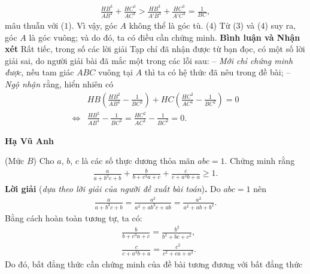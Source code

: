 \begin{multicols}{2}
	\begin{align*}
		\frac{{H{B^3}}}{{A{B^4}}} + \frac{{H{C^3}}}{{A{C^4}}} > \frac{{H{B^3}}}{{A'{B^4}}} + \frac{{H{C^3}}}{{A'{C^4}}} = \frac{1}{{BC}},
	\end{align*}
	mâu thuẫn với ($1$). Vì vậy, góc $A$ không thể là góc tù.  \hfill ($4$)
	\vskip 0.05cm
	Từ ($3$) và ($4$) suy ra, góc $A$ là góc vuông; và do đó, ta có điều cần chứng minh.
	\vskip 0.05cm
	\textbf{\color{thachthuctoanhoc}Bình luận và Nhận xét}
	\vskip 0.05cm
	Rất tiếc, trong số các lời giải Tạp chí đã nhận được từ bạn đọc, có một số lời giải sai, do người giải bài đã mắc một trong các lỗi sau:
	\vskip 0.05cm
	-- \textit{Mới chỉ chứng minh được}, nếu tam giác $ABC$ vuông tại $A$ thì ta có hệ thức đã nêu trong đề bài;
	\vskip 0.05cm
	-- \textit{Ngộ nhận} rằng, hiển nhiên có
	\begin{align*}
		&HB\!\left(\!\!\!\frac{{H{B^2}}}{{A{B^4}}} \!-\! \frac{1}{{B{C^2}}}\!\!\! \right)\!\!+\! HC \! \left(\!\!\!\frac{{H{C^2}}}{{A{C^4}}} \!-\! \frac{1}{{B{C^2}}} \!\!\!\right) \!\!=\! 0\\
		\Leftrightarrow &\frac{{H{B^2}}}{{A{B^4}}} - \frac{1}{{B{C^2}}} = \frac{{H{C^2}}}{{A{C^4}}} - \frac{1}{{B{C^2}}} = 0.
	\end{align*}
	\begin{flushright}
		\textbf{\color{thachthuctoanhoc}Hạ Vũ Anh}
	\end{flushright}
	{}
	(Mức $B$)
	Cho $a$, $b$, $c$ là các số thực dương thỏa mãn $abc = 1$. Chứng minh rằng
	\begin{align*}
		\frac{a}{{a \!+ \!{b^3}c \!+\! b}} \!+\! \frac{b}{{b \!+\! {c^3}a \!+\! c}} \!+\! \frac{c}{{c \!+\! {a^3}b \!+\! a}} \ge 1.
	\end{align*}
	\textbf{\color{thachthuctoanhoc}Lời giải} (\textit{dựa theo lời giải của người đề xuất bài toán})\textbf{\color{thachthuctoanhoc}.}
	\vskip 0.05cm
	Do $abc = 1$ nên
	\begin{align*}
		\frac{a}{{a \!+\! {b^3}c \!+\! b}} \!=\! \frac{{{a^2}}}{{{a^2} \!+\! a{b^3}c \!+\! ab}} \!=\! \frac{{{a^2}}}{{{a^2} \!+\! ab \!+\! {b^2}}}.
	\end{align*}
	Bằng cách hoàn toàn tương tự, ta có:
	\begin{align*}
		&\frac{b}{{b + {c^3}a + c}} = \frac{{{b^2}}}{{{b^2} + bc + {c^2}}},\\ &\frac{c}{{c + {a^3}b + a}} = \frac{{{c^2}}}{{{c^2} + ca + {a^2}}}.
	\end{align*}
	Do đó, bất đẳng thức cần chứng minh của đề bài tương đương với bất đẳng thức

\end{multicols}

